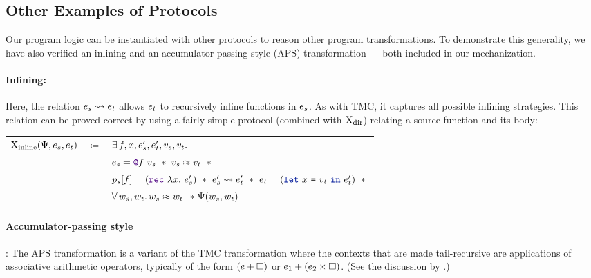 \subsection{Other Examples of Protocols}

Our program logic can be instantiated with other protocols to reason other program transformations.
To demonstrate this generality, we have also verified an inlining and an accumulator-passing-style (APS) transformation --- both included in our mechanization.

\paragraph{Inlining:} Here, the relation $\datalangExpr_s \rightsquigarrow \datalangExpr_t$ allows $\datalangExpr_t$ to recursively inline functions in $\datalangExpr_s$.
As with TMC, it captures all possible inlining strategies.
%
This relation can be proved correct by using a fairly simple protocol (combined with $\mathrm{X}_\mathrm{dir}$) relating a source function and its body:

\begin{tabular}{rcl}
        $\iProt_\mathrm{inline} (\iPredTwo, \datalangExpr_s, \datalangExpr_t)$
        & $\coloneqq$ &
        $\exists \datalangFn, \datalangVar, \datalangExpr_s', \datalangExpr_t', \datalangVal_s, \datalangVal_t \ldotp$
    \\
        &&
        $
        \datalangExpr_s = \datalangCall{\datalangFnptr{\datalangFn}}{\datalangVal_s}
        \ \iSep\ %
        \datalangVal_s \iSimilar \datalangVal_t
        \ \iSep {}$
    \\
        &&
        $\datalangProg_s [\datalangFn] = (\datalangRec{\datalangVar}{\datalangExpr_s'})
        \ \iSep\ %
        \datalangExpr_s' \rightsquigarrow \datalangExpr_t'
        \ \iSep\ %
        \datalangExpr_t = (\datalangLet{\datalangVar}{\datalangVal_t}{\datalangExpr_t'})
        \ \iSep {}$
    \\
        &&
        $\forall \datalangValTwo_s, \datalangValTwo_t \ldotp
        \datalangValTwo_s \iSimilar \datalangValTwo_t \iWand
        \iPredTwo (\datalangValTwo_s, \datalangValTwo_t)$
\end{tabular}
\medskip

\paragraph{Accumulator-passing style}: The APS transformation is a variant of the TMC transformation where the contexts that are made tail-recursive are applications of associative arithmetic operators, typically of the form $(\datalangExpr + \datalangCtxHole)$ or $\datalangExpr_1 + (\datalangExpr_2 \times \datalangCtxHole)$. (See the discussion by \citet*{tmc-koka-2023}.)

